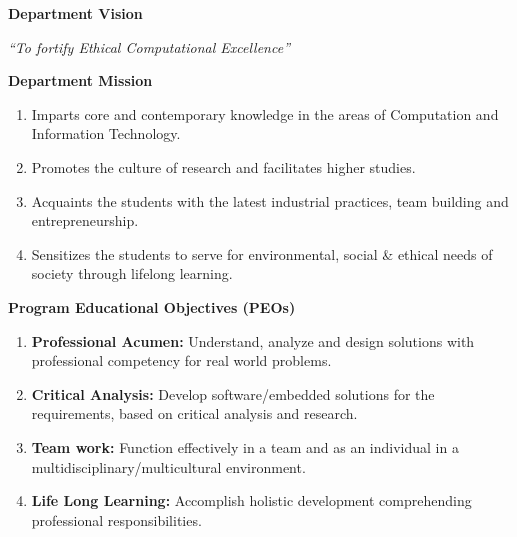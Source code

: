 
\clearpage
\thispagestyle{empty}

\begingroup
\centering

{\Large\bfseries Department Vision}\par\vspace{0.75em}
\emph{``To fortify Ethical Computational Excellence''}\par\vspace{1.5em}

{\Large\bfseries Department Mission}\par\vspace{0.75em}
\begin{minipage}{0.9\textwidth}
\raggedright
\begin{enumerate}
\item[M1:] Imparts core and contemporary knowledge in the areas of Computation and Information Technology.
\item[M2:] Promotes the culture of research and facilitates higher studies.
\item[M3:] Acquaints the students with the latest industrial practices, team building and entrepreneurship.
\item[M4:] Sensitizes the students to serve for environmental, social \& ethical needs of society through lifelong learning.
\end{enumerate}
\end{minipage}\par\vspace{1.5em}

{\Large\bfseries Program Educational Objectives (PEOs)}\par\vspace{0.75em}
\begin{minipage}{0.9\textwidth}
\raggedright
\begin{enumerate}
\item[PEO1:] \textbf{Professional Acumen:} Understand, analyze and design solutions with professional competency for real world problems.
\item[PEO2:] \textbf{Critical Analysis:} Develop software/embedded solutions for the requirements, based on critical analysis and research.
\item[PEO3:] \textbf{Team work:} Function effectively in a team and as an individual in a multidisciplinary/multicultural environment.
\item[PEO4:] \textbf{Life Long Learning:} Accomplish holistic development comprehending professional responsibilities.
\end{enumerate}
\end{minipage}

\endgroup
\clearpage
